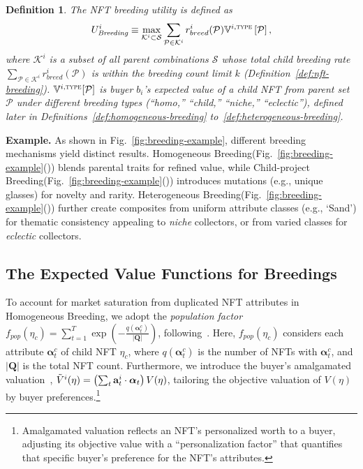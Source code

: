 \documentclass[conference]{IEEEtran}
\theoremstyle{plain}
\newtheorem{definition}{Definition}
\newcommand*{\defeq}{\equiv}
\begin{document}
\begin{definition}
    \label{def:buyer-utility-breeding}
    The NFT breeding utility is defined as
    \begin{equation}\small
    \label{eqn:breeding-utility}
    U^i_\textit{Breeding} \defeq \max_{\mathcal{K}^i\subset\mathcal{S}} \sum_{\mathcal{P}\in \mathcal{K}^i}
    r_{breed}^i(\mathcal{P})\mathbb{V}^{i, \textsc{type}}\left[\mathcal{P}\right],
    \end{equation}
    where $\mathcal{K}^i$ is a subset of all parent combinations $\mathcal{S}$ whose total child breeding rate\xspace $\sum_{\mathcal{P}\in \mathcal{K}^i}r_{breed}^i(\mathcal{P})$ is within the breeding count limit $k$ (Definition~\ref{def:nft-breeding}). $\mathbb{V}^{i, \textsc{type}}[\mathcal{P}]$ is buyer $b_i$'s expected value of a child NFT from parent set $\mathcal{P}$ under different breeding types (``homo,'' ``child,'' ``niche,'' ``eclectic''), defined later in Definitions~\ref{def:homogeneous-breeding} to~\ref{def:heterogeneous-breeding}.
\end{definition}
\noindent\textbf{Example.} As shown in Fig.~\ref{fig:breeding-example}, different breeding mechanisms yield distinct results. Homogeneous Breeding\xspace (Fig.~\ref{fig:breeding-example}()) blends parental traits for refined value, while Child-project Breeding\xspace (Fig.~\ref{fig:breeding-example}()) introduces mutations (e.g., unique glasses) for novelty and rarity. Heterogeneous Breeding\xspace (Fig.~\ref{fig:breeding-example}()) further create composites from uniform attribute classes (e.g., `Sand') for thematic consistency appealing to \textit{niche} collectors, or from varied classes for \textit{eclectic} collectors. 

\subsection{The Expected Value Functions for Breedings}
\label{subsec:expected-value-breeding}

To account for market saturation from duplicated NFT attributes in Homogeneous Breeding\xspace, we adopt the \emph{population factor} $f_{pop}(\eta_c)=\sum_{t=1}^{T}\exp\left(-\frac{q(\bm{\alpha}^c_t)}{|\mathbf{Q}|}\right)$, following~\cite{mekacher2022heterogeneous}. Here, $f_{pop}(\eta_c)$ considers each attribute $\bm{\alpha}^c_t$ of child NFT $\eta_c$, where $q(\bm{\alpha}^c_t)$ is the number of NFTs with $\bm{\alpha}^c_t$, and $|\mathbf{Q}|$ is the total NFT count. Furthermore, we introduce the buyer's amalgamated valuation~\cite{mekacher2022heterogeneous, costa2023show}, $\Tilde{V}^i(\eta) = \left(\sum_t\mathbf{a}^{i}_t \cdot \bm{\alpha}_t \right)V(\eta)$, tailoring the objective valuation of $V(\eta)$ by buyer preferences.\footnote{Amalgamated valuation reflects an NFT's personalized worth to a buyer, adjusting its objective value with a ``personalization factor'' that quantifies that specific buyer's preference for the NFT's attributes.}
\end{document}
